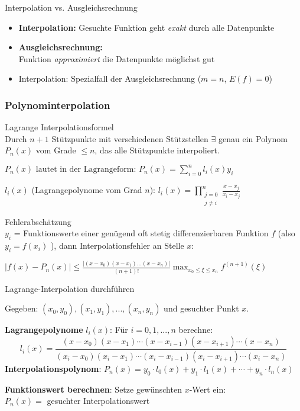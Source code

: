 \begin{concept}{Interpolation vs. Ausgleichsrechnung}
\begin{itemize}
    \item \textbf{Interpolation:} Gesuchte Funktion geht \emph{exakt} durch alle Datenpunkte
    \item \textbf{Ausgleichsrechnung:} \\Funktion \emph{approximiert} die Datenpunkte möglichst gut
    \item Interpolation: Spezialfall der Ausgleichsrechnung ($m = n$, $E(f) = 0$)
\end{itemize}
\end{concept}

\subsubsection{Polynominterpolation}

\begin{theorem}{Lagrange Interpolationsformel}\\
Durch $n+1$ Stützpunkte mit verschiedenen Stützstellen $\exists$ genau ein Polynom $P_n(x)$ vom Grade $\leq n$, das alle Stützpunkte interpoliert.

$P_n(x) \text{ lautet in der Lagrangeform: } P_n(x) = \sum_{i=0}^{n} l_i(x) y_i$

$l_i(x)$ (Lagrangepolynome vom Grad $n$):
$l_i(x) = \prod_{\substack{j=0 \\ j \neq i}}^{n} \frac{x - x_j}{x_i - x_j}$
\end{theorem}

\begin{corollary}{Fehlerabschätzung}\\
$y_i$ = Funktionswerte einer genügend oft stetig differenzierbaren Funktion $f$ (also $y_i=f(x_i)$ ), 
dann Interpolationsfehler an Stelle $x$:

$
\left|f(x)-P_n(x)\right| \leq \frac{\left|(x-x_0)(x-x_1) \ldots(x-x_n)\right|}{(n+1)!} \max _{x_0 \leq \xi \leq x_n} f^{(n+1)}(\xi)
$
\end{corollary}

\begin{KR}{Lagrange-Interpolation durchführen}

Gegeben: $(x_0, y_0), (x_1, y_1), ..., (x_n, y_n)$ und gesuchter Punkt $x$.

\textbf{Lagrangepolynome} $l_i(x)$:
Für $i = 0, 1, ..., n$ berechne:
$$l_i(x) = \frac{(x-x_0)(x-x_1)\cdots(x-x_{i-1})(x-x_{i+1})\cdots(x-x_n)}{(x_i-x_0)(x_i-x_1)\cdots(x_i-x_{i-1})(x_i-x_{i+1})\cdots(x_i-x_n)}$$
\textbf{Interpolationspolynom}:
$P_n(x) = y_0 \cdot l_0(x) + y_1 \cdot l_1(x) + \cdots + y_n \cdot l_n(x)$

\textbf{Funktionswert berechnen}:
Setze gewünschten $x$-Wert ein: \\ $P_n(x) = $ gesuchter Interpolationswert
\end{KR}

